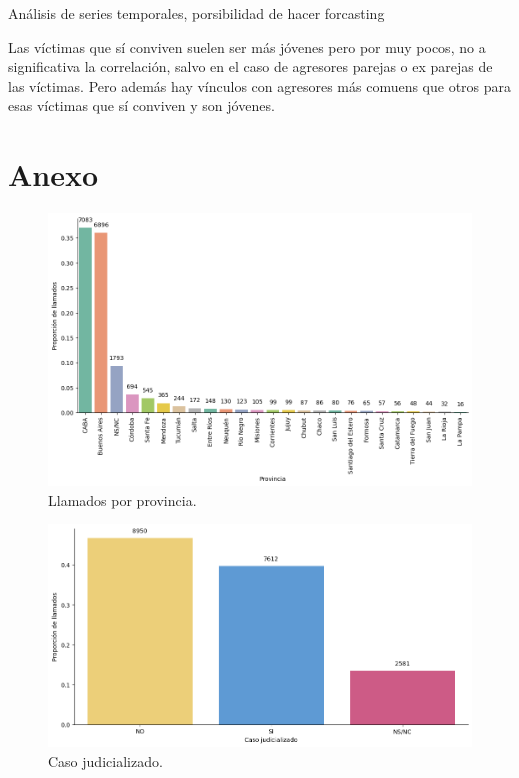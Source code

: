 \documentclass[10 pt]{article}
\begin{document}
Análisis de series temporales, porsibilidad de hacer forcasting

Las víctimas que sí conviven suelen ser más jóvenes pero por muy pocos, no a significativa la correlación, salvo en el caso de agresores parejas o ex parejas de las víctimas. Pero además hay vínculos con agresores más comuens que otros para esas víctimas que sí conviven y son jóvenes.
\newpage




\newpage
\section{Anexo}\label{anex}




\begin{figure}[H]
\begin{center}
\includegraphics[scale=.5]{images/latex_llamados_por_provincia.png}
\caption{Llamados por provincia.}
\label{provincia}
\end{center}
\end{figure}

\begin{figure}[H]
\begin{center}
\includegraphics[scale=.5]{images/latex_caso_judicializado.png}
\caption{Caso judicializado.}
\label{casojudicializado}
\end{center}
\end{figure}
\end{document}
